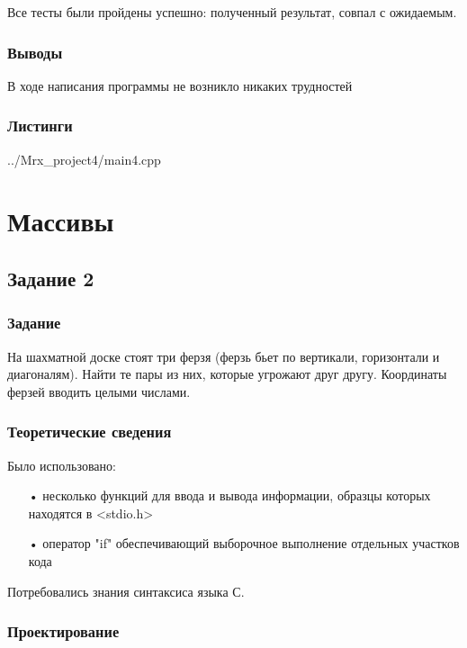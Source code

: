 \documentclass[12pt,a4paper]{report}
\begin{document}
Все тесты были пройдены успешно: полученный результат, совпал с ожидаемым.


\subsection{Выводы}

В ходе написания программы не возникло никаких трудностей

\subsection*{Листинги}


{../Mrx_project4/main4.cpp}


\chapter{Массивы}

\section{Задание 2}

\subsection{Задание}

На шахматной доске стоят три ферзя (ферзь бьет по вертикали, горизонтали и диагоналям). Найти те пары из них, которые угрожают друг другу. Координаты ферзей вводить целыми числами.

\subsection{Теоретические сведения}

Было использовано:
\begin{enumerate}
\item[•] несколько функций для ввода и вывода информации, образцы которых находятся в <stdio.h>
\item[•] оператор "if" обеспечивающий выборочное выполнение отдельных участков кода
\end{enumerate}

Потребовались знания синтаксиса языка С.

\subsection{Проектирование}
\end{document}
